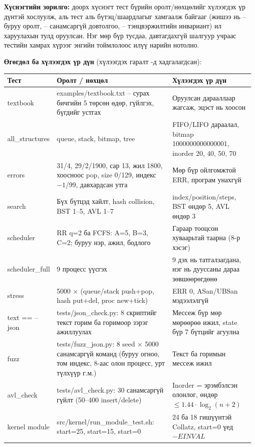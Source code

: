 \textbf{Хүснэгтийн зорилго:} доорх хүснэгт тест бүрийн оролт/нөхцөлийг хүлээгдэх үр дүнтэй хослуулж, аль тест аль бүтэц/шаардлагыг хамгаалж байгааг (жишээ нь  -- буруу оролт,  -- санамсаргүй довтолгоо,  -- тэнцвэржилтийн инвариант) ил харуулахын тулд оруулсан. Нэг мөр бүр тусдаа, давтагдахгүй шалгуур учраас тестийн хамрах хүрээг энгийн тоймлолоос илүү нарийн нотолно.

\textbf{Өгөгдөл ба хүлээгдэх үр дүн} (хүлээгдэх гаралт -д хадгалагдсан):

{\fontsize{9.5}{12}\selectfont
\begin{tabular}{|L{0.16\textwidth}|L{0.40\textwidth}|L{0.37\textwidth}|}
\hline
\textbf{Тест} & \textbf{Оролт / нөхцөл} & \textbf{Хүлээгдэх үр дүн} \\ \hline
textbook & examples/textbook.txt -- сурах бичгийн 5 төрсөн өдөр, гүйлгэх, бүгдийг устгах & Оруулсан дарааллаар жагсаж, эцэст нь хоосон \\ \hline
all\_structures & queue, stack, bitmap, tree & FIFO/LIFO дараалал, bitmap 1000000000000001, inorder 20, 40, 50, 70 \\ \hline
errors & 31/4, 29/2/1900, сар 13, жил 1800, хоосноос pop, size 0/129, индекс $-1$/99, давхардсан утга & Мөр бүр ойлгомжтой ERR, програм унахгүй \\ \hline
search & Бүх бүтцэд хайлт, hash collision, BST 1--5, AVL 1--7 & index/position/steps, BST өндөр 5, AVL өндөр 3 \\ \hline
scheduler & RR q=2 ба FCFS: A=5, B=3, C=2; буруу нэр, ажил, бодлого & Гараар тооцсон хуваарьтай таарна (8-р хэсэг) \\ \hline
scheduler\_full & 9 процесс үүсгэх & 9 дэх нь татгалзагдана, нэг нь дууссаны дараа зөвшөөрөгдөнө \\ \hline
stress & 5000 × (queue/stack push+pop, hash put+del, proc new+tick) & ERR 0, ASan/UBSan мэдээлэлгүй \\ \hline
text == --json & tests/json\_check.py: 8 скриптийг текст горим ба  горимоор зэрэг ажиллуулах & Мессеж бүр мөр мөрөөрөө ижил, state бүр 7 бүтцийг агуулна \\ \hline
fuzz & tests/fuzz\_json.py: 8 seed × 5000 санамсаргүй команд (буруу огноо, том индекс, 8-аас олон процесс, урт түлхүүр г.м.) & Текст ба  горимын мессеж ижил \\ \hline
avl\_check & tests/avl\_check.py: 30 санамсаргүй гүйлт (50--400 insert/delete) & Inorder = эрэмбэлсэн олонлог, өндөр $\le 1.44\cdot\log_2(n+2)$ \\ \hline
kernel module & src/kernel/run\_module\_test.sh: start=25, start=15, start=0 & 24 ба 18 гишүүнтэй Collatz, start=0 үед $-EINVAL$ \\ \hline
\end{tabular}
\par}

